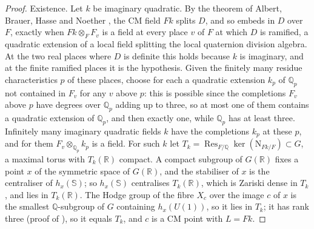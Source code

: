 \documentclass[11pt,reqno]{amsart}
\theoremstyle{plain}
\theoremstyle{definition}
\theoremstyle{remark}
\newcommand{\QQ}{\mathbb{Q}}
\newcommand{\RR}{\mathbb{R}}
\newcommand{\Nm}{\mathrm{N}}             %
\DeclareMathOperator{\Res}{Res}
\begin{document}
\begin{proof}
Existence. Let $k$ be imaginary quadratic. By the theorem of Albert, Brauer,
Hasse and Noether \cite[\S1.5]{PR94}, the CM field $Fk$ splits $D$, and so
embeds in $D$ over $F$, exactly when $Fk\otimes_{F}F_{v}$ is a field at
every place $v$ of $F$ at which $D$ is ramified, a quadratic extension of a
local field splitting the local quaternion division algebra. At the two real
places where $D$ is definite this holds because $k$ is imaginary, and at the
finite ramified places it is the hypothesis. Given the finitely many
residue characteristics $p$ of these places, choose for each a quadratic
extension $k_{p}$ of $\QQ_{p}$ not contained in $F_{v}$ for any $v$ above
$p$: this is possible since the completions $F_{v}$ above $p$ have degrees
over $\QQ_{p}$ adding up to three, so at most one of them contains a
quadratic extension of $\QQ_{p}$, and then exactly one, while $\QQ_{p}$ has
at least three. Infinitely many imaginary quadratic fields $k$ have the
completions $k_{p}$ at these $p$, and for them
$F_{v}\otimes_{\QQ_{p}}k_{p}$ is a field. For such $k$ let
$T_{k}=\Res_{F/\QQ}\ker(\Nm_{Fk/F})\subset G$, a maximal torus with
$T_{k}(\RR)$ compact. A compact subgroup of $G(\RR)$ fixes a point $x$ of the
symmetric space of $G(\RR)$, and the stabiliser of $x$ is the centraliser of
$h_{x}(\mathbb{S})$; so $h_{x}(\mathbb{S})$ centralises $T_{k}(\RR)$, which
is Zariski dense in $T_{k}$, and lies in $T_{k}(\RR)$. The Hodge group of
the fibre $X_{c}$ over the image $c$ of $x$ is the smallest $\QQ$-subgroup
of $G$ containing $h_{x}(U(1))$, so it lies in $T_{k}$; it has rank three
(proof of ), so it equals $T_{k}$, and $c$ is a CM
point with $L=Fk$.
\end{proof}
\end{document}
